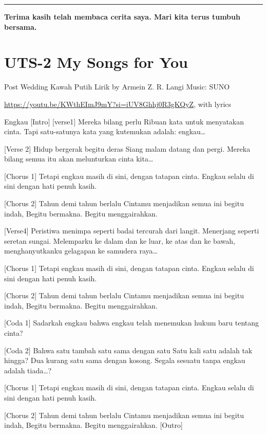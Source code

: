 \documentclass[
  letterpaper,
  DIV=11,
  numbers=noendperiod]{scrreprt}
\begin{document}
\begin{center}\rule{0.5\linewidth}{0.5pt}\end{center}

\textbf{Terima kasih telah membaca cerita saya. Mari kita terus tumbuh
bersama.}


\chapter{UTS-2 My Songs for You}\label{uts-2-my-songs-for-you}

Post Wedding Kawah Putih Lirik by Armein Z. R. Langi Music: SUNO

\url{https://youtu.be/KWthEImJ9mY?si=iUV8Ghhj0R3gKQyZ}, with lyrics

Engkau {[}Intro{]} {[}verse1{]} Mereka bilang perlu Ribuan kata untuk
menyatakan cinta. Tapi satu-satunya kata yang kutemukan adalah:
engkau\ldots{}

{[}Verse 2{]} Hidup bergerak begitu deras Siang malam datang dan pergi.
Mereka bilang semua itu akan melunturkan cinta kita\ldots{}

{[}Chorus 1{]} Tetapi engkau masih di sini, dengan tatapan cinta. Engkau
selalu di sini dengan hati penuh kasih.

{[}Chorus 2{]} Tahun demi tahun berlalu Cintamu menjadikan semua ini
begitu indah, Begitu bermakna. Begitu menggairahkan.

{[}Verse4{]} Peristiwa menimpa seperti badai tercurah dari langit.
Menerjang seperti seretan sungai. Melemparku ke dalam dan ke luar, ke
atas dan ke bawah, menghanyutkanku gelagapan ke samudera raya\ldots{}

{[}Chorus 1{]} Tetapi engkau masih di sini, dengan tatapan cinta. Engkau
selalu di sini dengan hati penuh kasih.

{[}Chorus 2{]} Tahun demi tahun berlalu Cintamu menjadikan semua ini
begitu indah, Begitu bermakna. Begitu menggairahkan.

{[}Coda 1{]} Sadarkah engkau bahwa engkau telah menemukan hukum baru
tentang cinta?

{[}Coda 2{]} Bahwa satu tambah satu sama dengan satu Satu kali satu
adalah tak hingga? Dua kurang satu sama dengan kosong. Segala sesuatu
tanpa engkau adalah tiada\ldots?

{[}Chorus 1{]} Tetapi engkau masih di sini, dengan tatapan cinta. Engkau
selalu di sini dengan hati penuh kasih.

{[}Chorus 2{]} Tahun demi tahun berlalu Cintamu menjadikan semua ini
begitu indah, Begitu bermakna. Begitu menggairahkan. {[}Outro{]}
\end{document}
